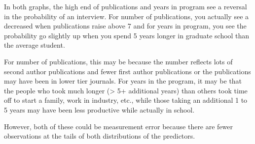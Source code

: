\documentclass{article}\usepackage[]{graphicx}\usepackage[]{color}
\newenvironment{knitrout}{}{} %
\begin{document}
\begin{knitrout}
\end{knitrout}

In both graphs, the high end of publications and years in program see a reversal in the probability of an interview. For number of publications, you actually see a decreased when publications raise above 7 and for years in program, you see the probability go slightly up when you spend 5 years longer in graduate school than the average student. 

For number of publications, this may be because the number reflects lots of second author publications and fewer first author publications or the publications may have been in lower tier journals. For years in the program, it may be that the people who took much longer (> 5+ additional years) than others took time off to start a family, work in industry, etc., while those taking an additional 1 to 5 years may have been less productive while actually in school. 

However, both of these could be measurement error because there are fewer observations at the tails of both distributions of the predictors.
\end{document}
